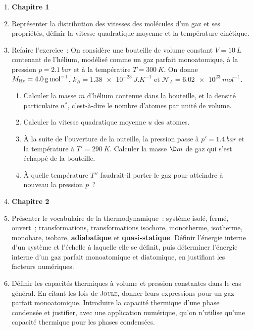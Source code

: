 \documentclass[a4paper, 12pt, final, garamond]{book}
\begin{document}
\begin{enumerate}[label=\sqenumi]
    \item[] \textbf{Chapitre 1}
    \item Représenter la distribution des vitesses des molécules d'un gaz et ses
      propriétés, définir la vitesse quadratique moyenne et la température
      cinétique.

    \item Refaire l'exercice~:
      On considère une bouteille de volume constant $V = \SI{10}{L}$ contenant
      de l'hélium, modélisé comme un gaz parfait monoatomique, à la pression $p
      = \SI{2.1}{bar}$ et à la températire $T = \SI{300}{K}$. On donne $M_{\rm
      He} = \SI{4.0}{g.mol^{-1}}$, $k_B = \SI{1.38e-23}{J.K^{-1}}$ et
      $\mathcal{N}_A = \SI{6.02e23}{mol^{-1}}$.
      \begin{enumerate}
        \item Calculer la masse $m$ d'hélium contenue dans la bouteille, et la
          densité particulaire $n^*$, c'est-à-dire le nombre d'atomes par unité
          de volume.
        \item Calculer la vitesse quadratique moyenne $u$ des atomes.
        \item À la suite de l'ouverture de la outeille, la pression passe à $p'
          = \SI{1.4}{bar}$ et la température à $T' = \SI{290}{K}$. Calculer la
          masse $\D m$ de gaz qui s'est échappé de la bouteille.
        \item À quelle température $T''$ faudrait-il porter le gaz pour
          atteindre à nouveau la pression $p$~?
      \end{enumerate}

    \item[] \textbf{Chapitre 2}
    \item Présenter le vocabulaire de la thermodynamique~: système isolé, fermé,
      ouvert~; transformations, transformations isochore, monotherme, isotherme,
      monobare, isobare, \textbf{adiabatique} et \textbf{quasi-statique}.
      Définir l'énergie interne d'un système et l'échelle à laquelle elle se
      définit, puis déterminer l'énergie interne d'un gaz parfait monoatomique
      et diatomique, en justifiant les facteurs numériques.

    \item Définir les capacités thermiques à volume et pression constantes dans
      le cas général. En citant les lois de \textsc{Joule}, donner leurs
      expressions pour un gaz parfait monoatomique. Introduire la capacité
      thermique d'une phase condensée et justifier, avec une application
      numérique, qu'on n'utilise qu'une capacité thermique pour les phases
      condensées.


\end{enumerate}
\end{document}
